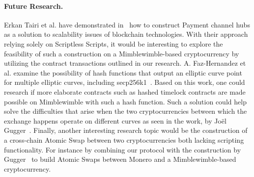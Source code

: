 \paragraph{Future Research.} Erkan Tairi et al. have demonstrated in~\cite{tairi2019a2l} how to construct Payment channel hubs as a solution to scalability issues of blockchain technologies.
With their approach relying solely on Scriptless Scripts, it would be interesting to explore the feasibility of such a construction on a Mimblewimble-based cryptocurrency by utilizing the contract transactions outlined in our research.
A. Faz-Hernandez et al. examine the possibility of hash functions that output an elliptic curve point for multiple elliptic curves, including secp256k1~\cite{hernandez2020hashing}.
Based on this work, one could research if more elaborate contracts such as hashed timelock contracts are made possible on Mimblewimble with such a hash function.
Such a solution could help solve the difficulties that arise when the two cryptocurrencies between which the exchange happens operate on different curves as seen in the work, by Joël Gugger~\cite{gugger2020bitcoin}.
Finally, another interesting research topic would be the construction of a cross-chain Atomic Swap between two cryptocurrencies both lacking scripting functionality.
For instance by combining our protocol with the construction by Gugger~\cite{gugger2020bitcoin} to build Atomic Swaps between Monero and a Mimblewimble-based cryptocurrency.